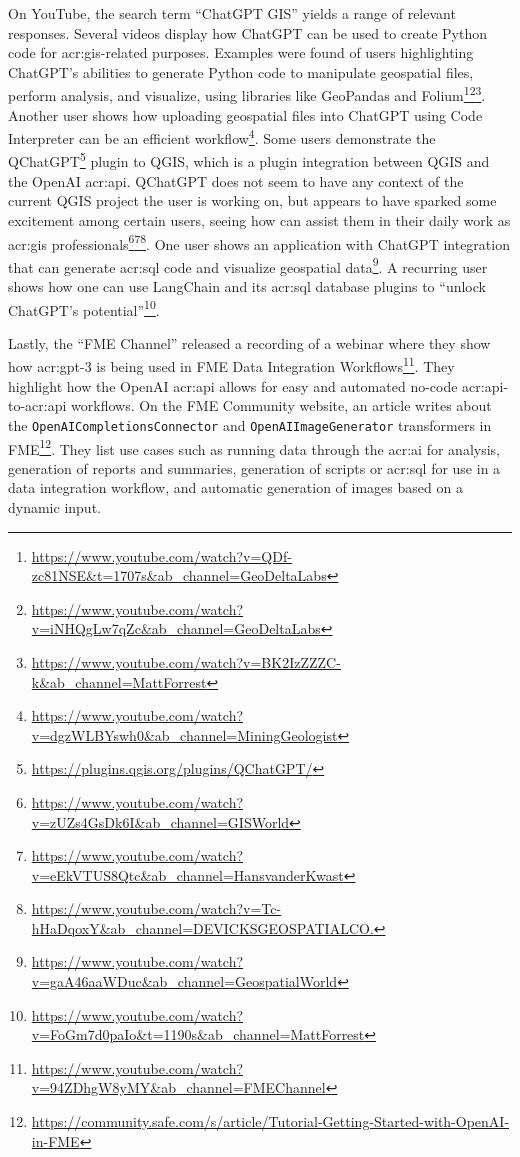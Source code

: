 On YouTube, the search term \enquote{ChatGPT GIS} yields a range of relevant responses. Several videos display how ChatGPT can be used to create Python code for \acrshort{acr:gis}-related purposes. Examples were found of users highlighting ChatGPT's abilities to generate Python code to manipulate geospatial files, perform analysis, and visualize, using libraries like GeoPandas and Folium\footnote{\url{https://www.youtube.com/watch?v=QDf-zc81NSE&t=1707s&ab_channel=GeoDeltaLabs}}\footnote{\url{https://www.youtube.com/watch?v=iNHQgLw7qZc&ab_channel=GeoDeltaLabs}}\footnote{\url{https://www.youtube.com/watch?v=BK2IzZZZC-k&ab_channel=MattForrest}}. Another user shows how uploading geospatial files into ChatGPT using Code Interpreter can be an efficient workflow\footnote{\url{https://www.youtube.com/watch?v=dgzWLBYswh0&ab_channel=MiningGeologist}}. Some users demonstrate the QChatGPT\footnote{\url{https://plugins.qgis.org/plugins/QChatGPT/}} plugin to QGIS, which is a plugin integration between QGIS and the OpenAI \acrshort{acr:api}. QChatGPT does not seem to have any context of the current QGIS project the user is working on, but appears to have sparked some excitement among certain users, seeing how  can assist them in their daily work as \acrshort{acr:gis} professionals\footnote{\url{https://www.youtube.com/watch?v=zUZs4GsDk6I&ab_channel=GISWorld}}\footnote{\url{https://www.youtube.com/watch?v=eEkVTUS8Qtc&ab_channel=HansvanderKwast}}\footnote{\url{https://www.youtube.com/watch?v=Tc-hHaDqoxY&ab_channel=DEVICKSGEOSPATIALCO.}}. One user shows an application with ChatGPT integration that can generate \acrshort{acr:sql} code and visualize geospatial data\footnote{\url{https://www.youtube.com/watch?v=gaA46aaWDuc&ab_channel=GeospatialWorld}}. A recurring user shows how one can use LangChain and its \acrshort{acr:sql} database plugins to \enquote{unlock ChatGPT's potential}\footnote{\url{https://www.youtube.com/watch?v=FoGm7d0paIo&t=1190s&ab_channel=MattForrest}}.

Lastly, the \enquote{FME Channel} released a recording of a webinar where they show how \acrshort{acr:gpt}-3 is being used in FME Data Integration Workflows\footnote{\url{https://www.youtube.com/watch?v=94ZDhgW8yMY&ab_channel=FMEChannel}}. They highlight how the OpenAI \acrshort{acr:api} allows for easy and automated no-code \acrshort{acr:api}-to-\acrshort{acr:api} workflows. On the FME Community website, an article writes about the \texttt{OpenAICompletionsConnector} and \texttt{OpenAIImageGenerator} transformers in FME\footnote{\url{https://community.safe.com/s/article/Tutorial-Getting-Started-with-OpenAI-in-FME}}. They list use cases such as running data through the \acrshort{acr:ai} for analysis, generation of reports and summaries, generation of scripts or \acrshort{acr:sql} for use in a data integration workflow, and automatic generation of images based on a dynamic input.

